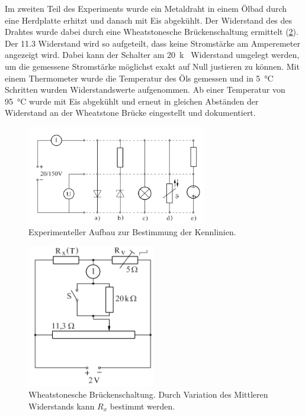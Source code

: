 \documentclass[
	a4paper,
	12pt,
	pagesize,
	ngerman
]{scrartcl}
\begin{document}
	Im zweiten Teil des Experiments wurde ein Metaldraht in einem Ölbad durch eine Herdplatte erhitzt und danach mit Eis abgekühlt.
	Der Widerstand des des Drahtes wurde dabei durch eine Wheatstonesche Brückenschaltung ermittelt (\cref{Wheatstone}).
	Der \SI{11,3}{\Omega} Widerstand wird so aufgeteilt, dass keine Stromstärke am Amperemeter angezeigt wird.
	Dabei kann der Schalter am \SI{20}{k\Omega} Widerstand umgelegt werden, um die gemessene Stromstärke möglichst exakt auf Null justieren zu können.
	Mit einem Thermometer wurde die Temperatur des Öls gemessen und in \SI{5}{\celsius} Schritten wurden Widerstandswerte aufgenommen. 
	Ab einer Temperatur von \SI{95}{\celsius} wurde mit Eis abgekühlt und erneut in gleichen Abständen der Widerstand an der Wheatstone Brücke eingestellt und dokumentiert.
	\begin{figure}[H]
		\includegraphics[width=0.7\textwidth]{Aufbau}
		\centering
		\caption{Experimenteller Aufbau zur Bestimmung der Kennlinien.\cite{WWU}} 
		\label{Aufbau}
		\centering
	\end{figure} 	
	\begin{figure}[H]
		\includegraphics[width=0.5\textwidth]{Wheatstone}
		\centering
		\caption{Wheatstonesche Brückenschaltung. Durch Variation des Mittleren Widerstands kann $R_x$ bestimmt werden.\cite{WWU}} 
		\label{Wheatstone}
		\centering
	\end{figure} 	
	
\end{document}
